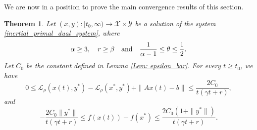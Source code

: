 \documentclass[pdflatex,sn-mathphys-num]{sn-jnl}
\theoremstyle{thmstyleone}
\newtheorem{theorem}{Theorem}
\theoremstyle{thmstyletwo}
\theoremstyle{thmstylethree}
\newcommand{\qbox}[1]{\quad\hbox{#1}\quad}
\newcommand{\X}{\mathcal{X}}
\newcommand{\Y}{\mathcal{Y}}
\begin{document}
We are now in a position to prove the main convergence results of this section. 


\begin{theorem} \label{T:rates}
Let $(x,y):[t_0,\infty)\to\X\times\Y$ be a solution of the system \eqref{inertial_primal_dual_system}, where
$$ \alpha\ge 3,\quad r\ge\beta \qbox{and} \frac{1}{\alpha-1}\le \theta \le \frac{1}{2}.$$
Let $C_0$ be the constant defined in Lemma \ref{Lem: epsilon_bar}. For every $t\ge t_0$, we have
\begin{equation} \label{E:main_thm}
    0\le \mathcal{L}_\rho\left(x(t),y^*\right) - \mathcal{L}_\rho(x^*,y^*) + \|Ax(t)-b\| \le \frac{2C_0}{t(\gamma t + r)},
\end{equation}
and
$$ -\frac{2C_0 \| y^* \| }{t(\gamma t + r)} \le f\left( x(t) \right) - f(x^*) \le \frac{2C_0 \left(1+\|y^* \|\right)}{t(\gamma t + r)}. $$
\end{theorem}
\end{document}
